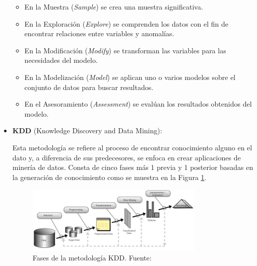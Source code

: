 \begin{itemize}
	\begin{itemize}
		\item En la Muestra (\textit{Sample}) se crea una muestra significativa.
		\item En la Exploración (\textit{Explore}) se comprenden los datos con el fin de encontrar relaciones entre variables y anomalías.
		\item En la Modificación (\textit{Modify}) se transforman las variables para las necesidades del modelo.
		\item En la Modelización (\textit{Model}) se aplican uno o varios modelos sobre el conjunto de datos para buscar resultados.
		\item En el Asesoramiento (\textit{Assessment}) se evalúan los resultados obtenidos del modelo.
	\end{itemize}
	
	\item \textbf{KDD} (Knowledge Discovery and Data Mining):
	
	Esta metodología se refiere al proceso de encontrar conocimiento alguno en el dato y, a diferencia de sus predecesores, se enfoca en crear aplicaciones de minería de datos. Consta de cinco fases más 1 previa y 1 posterior basadas en la generación de conocimiento como se muestra en la Figura \ref{2:fig9}.
	\begin{figure}[h]
		\begin{center}
			\includegraphics[width=0.80\textwidth]{2/figures/kdd.jpg}
			\caption[Fases de la metodología KDD]{Fases de la metodología KDD. Fuente: \cite{tec_braulio2015metodologiasdm}}
			\label{2:fig9}
		\end{center}
	\end{figure}
	

\end{itemize}
